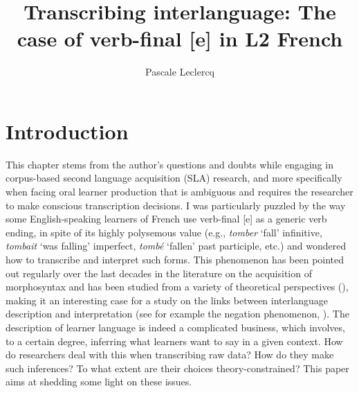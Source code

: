 \documentclass[output=paper,colorlinks,citecolor=brown,modfonts,nonflat]{../langscibook}
\author{Pascale Leclercq\affiliation{Université Paul Valéry Montpellier 3}\orcid{}}
\title{Transcribing interlanguage: The case of verb-final [e] in L2 French}
\begin{document}
\maketitle 
{}


\section{Introduction}

This chapter stems from the author’s questions and doubts while engaging in corpus-based second language acquisition (SLA) research, and more specifically when facing oral learner production that is ambiguous and requires the researcher to make conscious transcription decisions. I was particularly puzzled by the way some English-speaking learners of French use verb-final [e] as a generic verb ending, in spite of its highly polysemous value (e.g., \textit{tomber} ‘fall’ infinitive, \textit{tombait} ‘was falling’ imperfect, \textit{tombé} ‘fallen’ past participle, etc.) and wondered how to transcribe and interpret such forms. This phenomenon has been pointed out regularly over the last decades in the literature on the acquisition of morphosyntax and has been studied from a variety of theoretical perspectives (\citealt{MylesEtAl1998,Herschensohn2001,BartningSchlyter2004}), making it an interesting case for a study on the links between interlanguage description and interpretation (see for example the negation phenomenon, \citealt{Ortega2014trying}). The description of learner language is indeed a complicated business, which involves, to a certain degree, inferring what learners want to say in a given context. How do researchers deal with this when transcribing raw data? How do they make such inferences? To what extent are their choices theory-constrained? This paper aims at shedding some light on these issues.
\end{document}
